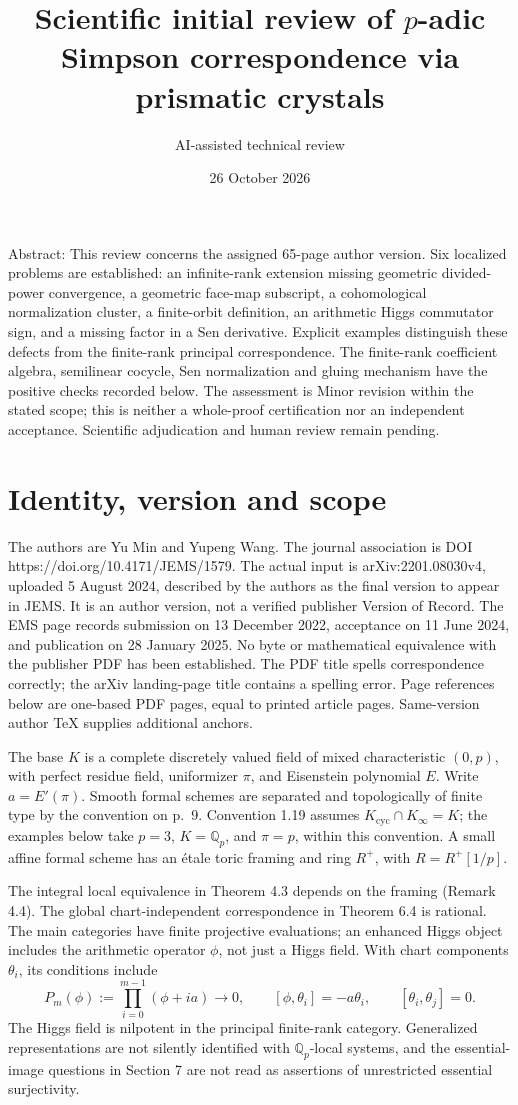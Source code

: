 \documentclass[10pt]{article}
\title{Scientific initial review of
\(p\)-adic Simpson correspondence via prismatic crystals}
\author{AI-assisted technical review}
\date{26 October 2026}
\begin{document}
\maketitle
Abstract: This review concerns the assigned 65-page author version. Six localized problems are established: an infinite-rank extension missing geometric divided-power convergence, a geometric face-map subscript, a cohomological normalization cluster, a finite-orbit definition, an arithmetic Higgs commutator sign, and a missing factor in a Sen derivative. Explicit examples distinguish these defects from the finite-rank principal correspondence. The finite-rank coefficient algebra, semilinear cocycle, Sen normalization and gluing mechanism have the positive checks recorded below. The assessment is Minor revision within the stated scope; this is neither a whole-proof certification nor an independent acceptance. Scientific adjudication and human review remain pending.\par
\section*{Identity, version and scope}
The authors are Yu Min and Yupeng Wang. The journal association is DOI https://doi.org/10.4171/JEMS/1579. The actual input is arXiv:2201.08030v4, uploaded 5 August 2024, described by the authors as the final version to appear in JEMS. It is an author version, not a verified publisher Version of Record. The EMS page records submission on 13 December 2022, acceptance on 11 June 2024, and publication on 28 January 2025. No byte or mathematical equivalence with the publisher PDF has been established. The PDF title spells correspondence correctly; the arXiv landing-page title contains a spelling error. Page references below are one-based PDF pages, equal to printed article pages. Same-version author TeX supplies additional anchors.\par
The base \(K\) is a complete discretely valued field of mixed characteristic \((0,p)\), with perfect residue field, uniformizer \(\pi\), and Eisenstein polynomial \(E\). Write \(a=E'(\pi)\). Smooth formal schemes are separated and topologically of finite type by the convention on p. 9. Convention 1.19 assumes \(K_{\mathrm{cyc}}\cap K_\infty=K\); the examples below take \(p=3\), \(K=\mathbb Q_p\), and \(\pi=p\), within this convention. A small affine formal scheme has an étale toric framing and ring \(R^+\), with \(R=R^+[1/p]\).\par
The integral local equivalence in Theorem 4.3 depends on the framing (Remark 4.4). The global chart-independent correspondence in Theorem 6.4 is rational. The main categories have finite projective evaluations; an enhanced Higgs object includes the arithmetic operator \(\phi\), not just a Higgs field. With chart components \(\theta_i\), its conditions include \[P_m(\phi):=\prod_{i=0}^{m-1}(\phi+ia)\longrightarrow0,\qquad
 [\phi,\theta_i]=-a\theta_i,\qquad [\theta_i,\theta_j]=0.
 \tag{1.1}\] The Higgs field is nilpotent in the principal finite-rank category. Generalized representations are not silently identified with \(\mathbb Q_p\)-local systems, and the essential-image questions in Section 7 are not read as assertions of unrestricted essential surjectivity.\par
\end{document}
